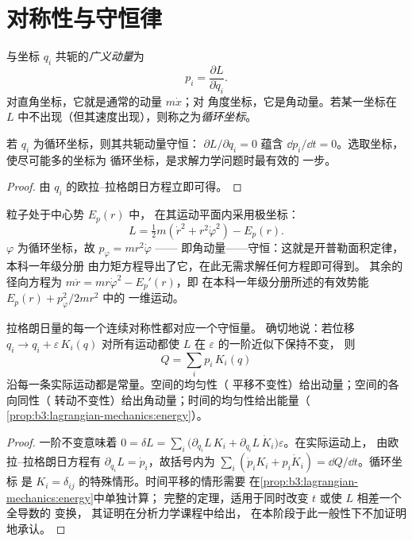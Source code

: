 \section{对称性与守恒律}

\begin{definition}\label{def:b3:lagrangian-mechanics:momentum}
与坐标 $q_i$ 共轭的\emph{广义动量}为
\[
p_i = \frac{\partial L}{\partial\dot q_i} .
\]
对直角坐标，它就是通常的动量 $m\dot x$；对
角度坐标，它是角动量。若某一坐标在
$L$ 中不出现（但其速度出现），则称之为\emph{循环坐标}。
\end{definition}

\begin{proposition}[循环坐标给出守恒律]\label{prop:b3:lagrangian-mechanics:cyclic}
若 $q_i$ 为循环坐标，则其共轭动量守恒：
$\partial L/\partial q_i = 0$ 蕴含 $\dd p_i/\dd t = 0$。选取坐标，使尽可能多的坐标为
循环坐标，是求解力学问题时最有效的
一步。
\end{proposition}

\begin{proof}
由 $q_i$ 的欧拉–拉格朗日方程立即可得。
\end{proof}

\begin{example}\label{ex:b3:lagrangian-mechanics:central}
粒子处于中心势 $E_p(r)$ 中，
在其运动平面内采用极坐标：
\[
L = \tfrac12 m(\dot r^2 + r^2\dot\varphi^2) - E_p(r) .
\]
$\varphi$ 为循环坐标，故 $p_\varphi = mr^2\dot\varphi$ ——
即角动量——守恒：这就是开普勒面积定律，本科一年级分册
由力矩方程导出了它，在此无需求解任何方程即可得到。
其余的径向方程为
$m\ddot r = mr\dot\varphi^2 - E_p'(r)$，即
在本科一年级分册所述的有效势能 $E_p(r) + p_\varphi^2/2mr^2$ 中的
一维运动。
\end{example}

\begin{theorem}[诺特定理]\label{thm:b3:lagrangian-mechanics:noether}
拉格朗日量的每一个连续对称性都对应一个守恒量。
确切地说：若位移 $q_i \to q_i + \varepsilon\,K_i(q)$
对所有运动都使 $L$ 在 $\varepsilon$ 的一阶近似下保持不变，
则
\[
Q = \sum_i p_i\,K_i(q)
\]
沿每一条实际运动都是常量。空间的均匀性（
平移不变性）给出动量；空间的各向同性（
转动不变性）给出角动量；时间的均匀性给出能量（
\cref{prop:b3:lagrangian-mechanics:energy}）。
\end{theorem}

\begin{proof}
一阶不变意味着
$0 = \delta L = \sum_i\big(\partial_{q_i}L\,K_i +
\partial_{\dot q_i}L\,\dot K_i\big)\varepsilon$。在实际运动上，
由欧拉–拉格朗日方程有 $\partial_{q_i}L = \dot p_i$，故括号内为
$\sum_i(\dot p_iK_i + p_i\dot K_i) = \dd Q/\dd t$。循环坐标
是 $K_i = \delta_{ij}$ 的特殊情形。时间平移的情形需要
在\cref{prop:b3:lagrangian-mechanics:energy}中单独计算；
完整的定理，适用于同时改变 $t$ 或使 $L$ 相差一个全导数的
变换，
其证明在分析力学课程中给出，
在本阶段于此一般性下不加证明地承认。
\end{proof}

